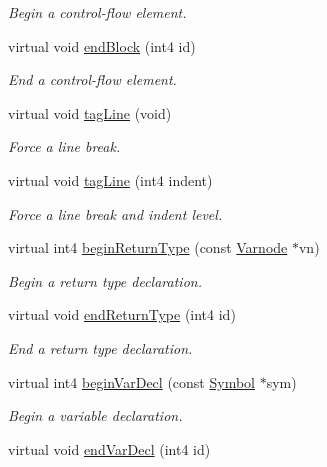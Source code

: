 \begin{DoxyCompactItemize}
\begin{DoxyCompactList}\small\item\em Begin a control-\/flow element. \end{DoxyCompactList}\item 
virtual void \mbox{\hyperlink{class_emit_pretty_print_a1d95f0f7503689370b28f9538690b5a4}{end\+Block}} (int4 id)
\begin{DoxyCompactList}\small\item\em End a control-\/flow element. \end{DoxyCompactList}\item 
virtual void \mbox{\hyperlink{class_emit_pretty_print_a986da682a9a028e8cf7ee8162f941014}{tag\+Line}} (void)
\begin{DoxyCompactList}\small\item\em Force a line break. \end{DoxyCompactList}\item 
virtual void \mbox{\hyperlink{class_emit_pretty_print_a9e14af0674eafd65ffdee52380944347}{tag\+Line}} (int4 indent)
\begin{DoxyCompactList}\small\item\em Force a line break and indent level. \end{DoxyCompactList}\item 
virtual int4 \mbox{\hyperlink{class_emit_pretty_print_a0318a1f41c45d521b22ca097a4a29793}{begin\+Return\+Type}} (const \mbox{\hyperlink{class_varnode}{Varnode}} $\ast$vn)
\begin{DoxyCompactList}\small\item\em Begin a return type declaration. \end{DoxyCompactList}\item 
virtual void \mbox{\hyperlink{class_emit_pretty_print_a4ea26b7a3fad1f933665392fa682f4b1}{end\+Return\+Type}} (int4 id)
\begin{DoxyCompactList}\small\item\em End a return type declaration. \end{DoxyCompactList}\item 
virtual int4 \mbox{\hyperlink{class_emit_pretty_print_a9df518db8bdc76a0327a05cc26701459}{begin\+Var\+Decl}} (const \mbox{\hyperlink{class_symbol}{Symbol}} $\ast$sym)
\begin{DoxyCompactList}\small\item\em Begin a variable declaration. \end{DoxyCompactList}\item 
virtual void \mbox{\hyperlink{class_emit_pretty_print_a468af036c0623c76311ea4d286940936}{end\+Var\+Decl}} (int4 id)

\end{DoxyCompactItemize}
